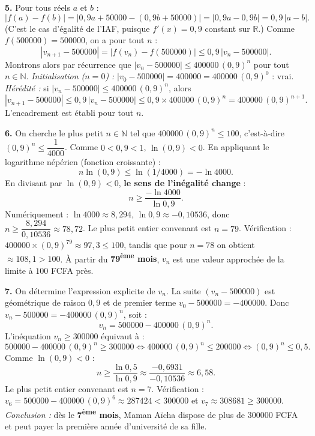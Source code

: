\documentclass[11pt]{article}
\begin{document}
\begin{exoresolu}
\textbf{5.} Pour tous réels $a$ et $b$ :
\[ |f(a)-f(b)| = |0{,}9a + \num{50000} - (0{,}9b + \num{50000})| = |0{,}9a - 0{,}9b| = 0{,}9\,|a-b|. \]
(C'est le cas d'égalité de l'IAF, puisque $f'(x)=0{,}9$ constant sur $\mathbb{R}$.)
Comme $f(\num{500000})=\num{500000}$, on a pour tout $n$ :
\[ |v_{n+1}-\num{500000}| = |f(v_n)-f(\num{500000})| \leq 0{,}9\,|v_n-\num{500000}|. \]
Montrons alors par récurrence que $|v_n-\num{500000}|\leq \num{400000}\,(0{,}9)^n$ pour tout $n\in\mathbb{N}$.
\emph{Initialisation ($n=0$) :} $|v_0-\num{500000}| = \num{400000} = \num{400000}\,(0{,}9)^0$ : vrai.
\emph{Hérédité :} si $|v_n-\num{500000}|\leq \num{400000}\,(0{,}9)^n$, alors
\[ |v_{n+1}-\num{500000}| \leq 0{,}9\,|v_n-\num{500000}| \leq 0{,}9 \times \num{400000}\,(0{,}9)^n = \num{400000}\,(0{,}9)^{n+1}. \]
L'encadrement est établi pour tout $n$.

\textbf{6.} On cherche le plus petit $n\in\mathbb{N}$ tel que $\num{400000}\,(0{,}9)^n \leq 100$, c'est-à-dire $(0{,}9)^n \leq \dfrac{1}{\num{4000}}$.
Comme $0<0{,}9<1$, $\ln(0{,}9)<0$. En appliquant le logarithme népérien (fonction croissante) :
\[ n \ln(0{,}9) \leq \ln(1/\num{4000}) = -\ln \num{4000}. \]
En divisant par $\ln(0{,}9)<0$, \textbf{le sens de l'inégalité change} :
\[ n \geq \frac{-\ln \num{4000}}{\ln 0{,}9}. \]
Numériquement : $\ln \num{4000} \approx 8{,}294$, $\ln 0{,}9 \approx -0{,}10536$, donc $n \geq \dfrac{8{,}294}{0{,}10536} \approx 78{,}72$.
Le plus petit entier convenant est $n=79$.
Vérification : $\num{400000}\times(0{,}9)^{79}\approx 97{,}3 \leq 100$, tandis que pour $n=78$ on obtient $\approx 108{,}1 > 100$.
À partir du \textbf{79\textsuperscript{ème} mois}, $v_n$ est une valeur approchée de la limite à $100$ FCFA près.

\textbf{7.} On détermine l'expression explicite de $v_n$. La suite $(v_n - \num{500000})$ est géométrique de raison $0{,}9$ et de premier terme $v_0 - \num{500000} = -\num{400000}$.
Donc $v_n - \num{500000} = -\num{400000}\,(0{,}9)^n$, soit :
\[ v_n = \num{500000} - \num{400000}\,(0{,}9)^n. \]
L'inéquation $v_n \geq \num{300000}$ équivaut à :
\[ \num{500000} - \num{400000}\,(0{,}9)^n \geq \num{300000} \iff \num{400000}\,(0{,}9)^n \leq \num{200000} \iff (0{,}9)^n \leq 0{,}5. \]
Comme $\ln(0{,}9)<0$ :
\[ n \geq \frac{\ln 0{,}5}{\ln 0{,}9} \approx \frac{-0{,}6931}{-0{,}10536} \approx 6{,}58. \]
Le plus petit entier convenant est $n=7$.
Vérification : $v_6 = \num{500000} - \num{400000}\,(0{,}9)^6 \approx \num{287424} < \num{300000}$ et $v_7 \approx \num{308681} \geq \num{300000}$.
\emph{Conclusion :} dès le \textbf{7\textsuperscript{ème} mois}, Maman Aïcha dispose de plus de \num{300000} FCFA et peut payer la première année d'université de sa fille.
\end{exoresolu}
\end{document}
